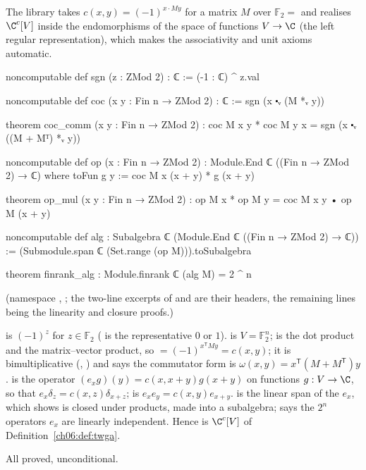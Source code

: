 The library takes $c(x,y)=(-1)^{x\cdot My}$ for a matrix $M$ over $\mathbb F_2=$  and
realises $\C^c[V]$ inside the endomorphisms of the space of functions $V\to\C$ (the left regular
representation), which makes the associativity and unit axioms automatic.

\begin{leancode}
noncomputable def sgn (z : ZMod 2) : ℂ := (-1 : ℂ) ^ z.val
\end{leancode}
\begin{leancode}
noncomputable def coc (x y : Fin n → ZMod 2) : ℂ := sgn (x ⬝ᵥ (M *ᵥ y))
\end{leancode}
\begin{leancode}
theorem coc_comm (x y : Fin n → ZMod 2) :
    coc M x y * coc M y x = sgn (x ⬝ᵥ ((M + Mᵀ) *ᵥ y))
\end{leancode}
\begin{leancode}
noncomputable def op (x : Fin n → ZMod 2) : Module.End ℂ ((Fin n → ZMod 2) → ℂ) where
  toFun g y := coc M x (x + y) * g (x + y)
\end{leancode}
\begin{leancode}
theorem op_mul (x y : Fin n → ZMod 2) : op M x * op M y = coc M x y • op M (x + y)
\end{leancode}
\begin{leancode}
noncomputable def alg : Subalgebra ℂ (Module.End ℂ ((Fin n → ZMod 2) → ℂ)) :=
  (Submodule.span ℂ (Set.range (op M))).toSubalgebra
\end{leancode}
\begin{leancode}
theorem finrank_alg : Module.finrank ℂ (alg M) = 2 ^ n
\end{leancode}
(namespace , ; the
two-line excerpts of  and  are their headers, the remaining lines being the
linearity and closure proofs.)
\begin{dictionary}
 is $(-1)^z$ for $z\in\mathbb F_2$ ( is the representative $0$ or $1$).
 is $V=\mathbb F_2^n$;  is the dot product and
 the matrix--vector product, so  $=(-1)^{x^{\mathsf T}My}=c(x,y)$; it
is bimultiplicative (, ) and  says the
commutator form is $\omega(x,y)=x^{\mathsf T}(M+M^{\mathsf T})y$.   is the operator
$(e_x g)(y)=c(x,x+y)g(x+y)$ on functions $g:V\to\C$, so that $e_x\delta_z=c(x,z)\delta_{x+z}$;
 is $e_xe_y=c(x,y)e_{x+y}$.   is the linear span of the $e_x$, which
 shows is closed under products, made into a subalgebra;  says the
$2^n$ operators $e_x$ are linearly independent.  Hence  is $\C^c[V]$ of
Definition~\ref{ch06:def:twga}.
\end{dictionary}
\begin{status}
All proved, unconditional.
\end{status}

